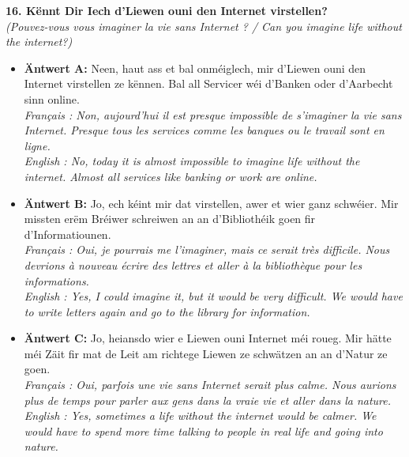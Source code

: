 \noindent\textbf{16. Kënnt Dir Iech d’Liewen ouni den Internet virstellen?}\\
\textit{(Pouvez-vous vous imaginer la vie sans Internet ? / Can you imagine life without the internet?)}
\begin{itemize}
    \item \textbf{Äntwert A:} Neen, haut ass et bal onméiglech, mir d'Liewen ouni den Internet virstellen ze kënnen. Bal all Servicer wéi d'Banken oder d'Aarbecht sinn online.\\
    \textit{Français : Non, aujourd'hui il est presque impossible de s'imaginer la vie sans Internet. Presque tous les services comme les banques ou le travail sont en ligne.}\\
    \textit{English : No, today it is almost impossible to imagine life without the internet. Almost all services like banking or work are online.}
    \item \textbf{Äntwert B:} Jo, ech kéint mir dat virstellen, awer et wier ganz schwéier. Mir missten erëm Bréiwer schreiwen an an d'Bibliothéik goen fir d'Informatiounen.\\
    \textit{Français : Oui, je pourrais me l'imaginer, mais ce serait très difficile. Nous devrions à nouveau écrire des lettres et aller à la bibliothèque pour les informations.}\\
    \textit{English : Yes, I could imagine it, but it would be very difficult. We would have to write letters again and go to the library for information.}
    \item \textbf{Äntwert C:} Jo, heiansdo wier e Liewen ouni Internet méi roueg. Mir hätte méi Zäit fir mat de Leit am richtege Liewen ze schwätzen an an d'Natur ze goen.\\
    \textit{Français : Oui, parfois une vie sans Internet serait plus calme. Nous aurions plus de temps pour parler aux gens dans la vraie vie et aller dans la nature.}\\
    \textit{English : Yes, sometimes a life without the internet would be calmer. We would have to spend more time talking to people in real life and going into nature.}
\end{itemize}
\vspace{0.5em}

